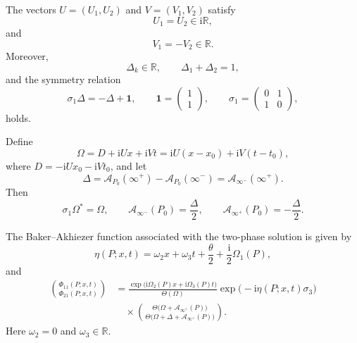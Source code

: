 \documentclass{amsart}
\numberwithin{equation}{hw}
\begin{document}
The vectors \(U=(U_1,U_2)\) and \(V=(V_1,V_2)\) satisfy
\begin{equation}
U_1
=
U_2
\in
\mathrm{i}\mathbb{R},
\label{eq:U-reality}
\end{equation}
and
\begin{equation}
V_1
=
-
V_2
\in
\mathbb{R}.
\label{eq:V-reality}
\end{equation}
Moreover,
\begin{equation}
\Delta_k\in\mathbb{R},
\qquad
\Delta_1+\Delta_2=1,
\label{eq:reality-conditions}
\end{equation}
and the symmetry relation
\begin{equation}
\sigma_1\Delta
=
-
\Delta
+
\bm{1},
\qquad
\bm{1}
=
\begin{pmatrix}
1\\
1
\end{pmatrix},
\qquad
\sigma_1
=
\begin{pmatrix}
0 & 1\\
1 & 0
\end{pmatrix},
\label{eq:Delta-symmetry}
\end{equation}
holds.

Define
\begin{equation}
\Omega
=
D+\mathrm{i}Ux+\mathrm{i}Vt
=
\mathrm{i}U(x-x_0)+\mathrm{i}V(t-t_0),
\label{eq:Omega-vector}
\end{equation}
where \(D=-\mathrm{i}Ux_0-\mathrm{i}Vt_0\), and let
\begin{equation}
\Delta
=
\mathcal{A}_{P_0}(\infty^+)
-
\mathcal{A}_{P_0}(\infty^-)
=
\mathcal{A}_{\infty^-}(\infty^+).
\label{eq:Delta-divisor}
\end{equation}
Then
\begin{equation}
\sigma_1\Omega^*
=
\Omega,
\qquad
\mathcal{A}_{\infty^-}(P_0)
=
\frac{\Delta}{2},
\qquad
\mathcal{A}_{\infty^+}(P_0)
=
-
\frac{\Delta}{2}.
\label{eq:Abel-symmetry}
\end{equation}

The Baker--Akhiezer function associated with the two-phase solution is given by
\begin{equation}
\eta(P;x,t)
=
\omega_2x+\omega_3t+\frac{\theta}{2}
+\frac{\mathrm{i}}{2}\Omega_1(P),
\label{eq:BA-phase-eta}
\end{equation}
and
\begin{equation}
\begin{aligned}
\binom{\Phi_{11}(P;x,t)}{\Phi_{21}(P;x,t)}
&=
\frac{\exp\!\bigl(\mathrm{i}\Omega_2(P)x+\mathrm{i}\Omega_3(P)t\bigr)}
{\Theta(\Omega)}
\exp\!\bigl(-\mathrm{i}\eta(P;x,t)\sigma_3\bigr)
\\
&\quad\times
\binom{
\Theta\bigl(\Omega+\mathcal{A}_{\infty^+}(P)\bigr)
}{
\Theta\bigl(\Omega+\Delta+\mathcal{A}_{\infty^+}(P)\bigr)
}.
\end{aligned}
\label{eq:BA-function}
\end{equation}
Here \(\omega_2=0\) and \(\omega_3\in\mathbb{R}\).
\end{document}
